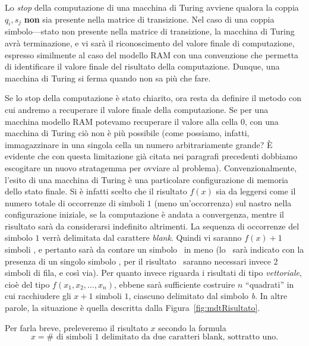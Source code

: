 \documentclass[10pt]{\classname}
\theoremstyle{definition}
\theoremstyle{definition}
\begin{document}
Lo \emph{stop} della computazione di una macchina di Turing avviene qualora la
coppia $q_i, s_j$ \textbf{non} sia presente nella matrice di transizione. Nel
caso di una coppia simbolo---stato non presente nella matrice di transizione,
la macchina di Turing avrà terminazione, e vi sarà il riconoscimento del valore
finale di computazione, espresso similmente al caso del modello RAM con una
convenzione che permetta di identificare il valore finale del risultato della
computazione. Dunque, una macchina di Turing si ferma quando non sa più che fare.

Se lo stop della computazione è stato chiarito, ora resta da definire il metodo
con cui andremo a recuperare il valore finale della computazione. Se per una
macchina modello RAM potevamo recuperare il valore alla cella 0, con una
macchina di Turing ciò non è più possibile (come possiamo, infatti,
immagazzinare in una singola cella un numero arbitrariamente grande? È evidente
che con questa limitazione già citata nei paragrafi precedenti dobbiamo
escogitare un nuovo stratagemma per ovviare al problema).
Convenzionalmente, l'esito di una macchina di Turing è una particolare
configurazione di memoria dello stato finale. Si è infatti scelto che
il risultato $f(x)$ sia da leggersi come il numero totale di occorrenze di simboli $1$
(meno un'occorrenza) sul nastro nella configurazione iniziale, se la computazione è
andata a convergenza, mentre il risultato sarà da considerarsi indefinito
altrimenti. La sequenza di occorrenze del simbolo $1$ verrà delimitata dal
carattere \emph{blank}. Quindi vi saranno $f(x) + 1$ simboli
\textquotesingle, e pertanto sarà da contare un simbolo
\textquotesingle\ in meno (lo
\textquotesingle\   sarà indicato con la presenza di un
singolo simbolo \textquotesingle, per il risultato
\textquotesingle\ saranno necessari invece 2 simboli
\textquotesingle di fila, e così via). Per quanto invece
riguarda i risultati di tipo \emph{vettoriale}, cioè del tipo
$f(x_1,x_2,\dots,x_n)$, ebbene sarà sufficiente costruire $n$ ``quadrati'' in
cui racchiudere gli $x+1$ simboli $1$, ciascuno delimitato dal simbolo
\emph{b}. In altre parole, la situazione è quella descritta dalla
Figura~\ref{fig:mdtRisultato}.

Per farla breve, preleveremo il risultato $x$ secondo la formula $$x = \# \mbox{ di simboli } 1 \mbox{ delimitato da due caratteri blank, sottratto uno}.$$
\end{document}
